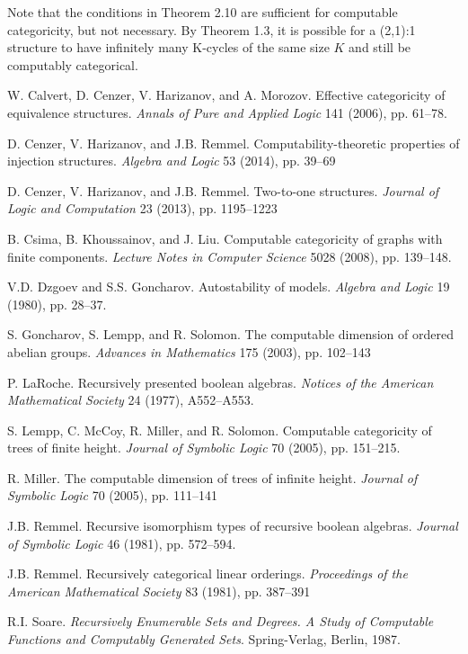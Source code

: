 \documentclass[12pt]{article}
\begin{document}
Note that the conditions in Theorem 2.10 are sufficient for computable categoricity, but not necessary. By Theorem 1.3, it is possible for a (2,1):1 structure to have infinitely many K-cycles of the same size $K$ and still be computably categorical.

\begin{thebibliography}{12}

W. Calvert, D. Cenzer, V. Harizanov, and A. Morozov.
Effective categoricity of equivalence structures.
\textit{Annals of Pure and Applied Logic} 141 (2006), pp. 61--78.

D. Cenzer, V. Harizanov, and J.B. Remmel.
Computability-theoretic properties of injection structures.
\textit{Algebra and Logic} 53 (2014), pp. 39--69

D. Cenzer, V. Harizanov, and J.B. Remmel.
Two-to-one structures.
\textit{Journal of Logic and Computation} 23 (2013), pp. 1195--1223

B. Csima, B. Khoussainov, and J. Liu.
Computable categoricity of graphs with finite components.
\textit{Lecture Notes in Computer Science} 5028 (2008), pp. 139--148.

V.D. Dzgoev and S.S. Goncharov. 
Autostability of models.
\textit{Algebra and Logic} 19 (1980), pp. 28--37.

S. Goncharov, S. Lempp, and R. Solomon.
The computable dimension of ordered abelian groups.
\textit{Advances in Mathematics} 175 (2003), pp. 102--143

P. LaRoche.
Recursively presented boolean algebras.
\textit{Notices of the American Mathematical Society} 24 (1977), A552--A553.

S. Lempp, C. McCoy, R. Miller, and R. Solomon.
Computable categoricity of trees of finite height.
\textit{Journal of Symbolic Logic} 70 (2005), pp. 151--215.

R. Miller.
The computable dimension of trees of infinite height.
\textit{Journal of Symbolic Logic} 70 (2005), pp. 111--141

J.B. Remmel.
Recursive isomorphism types of recursive boolean algebras.
\textit{Journal of Symbolic Logic} 46 (1981), pp. 572--594.

J.B. Remmel.
Recursively categorical linear orderings.
\textit{Proceedings of the American Mathematical Society} 83 (1981), pp. 387--391

R.I. Soare.
\textit{Recursively Enumerable Sets and Degrees. A Study of Computable Functions and Computably Generated Sets}.
Spring-Verlag, Berlin, 1987.


\end{thebibliography}
\end{document}
